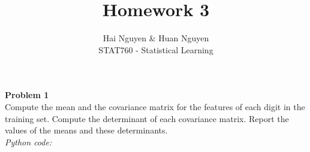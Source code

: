 \documentclass[12pt]{article}
\begin{document}
 
 
 
\title{Homework 3}%
\author{Hai Nguyen \& Huan Nguyen\\ %
STAT760 - Statistical Learning} %
 
\maketitle
 
\textbf{Problem 1}
\\Compute the mean and the covariance matrix for the features of each digit in the
training set. Compute the determinant of each covariance matrix. Report the values of
the means and these determinants.
\\\textit{Python code:}
\end{document}
